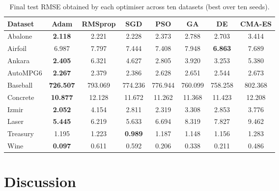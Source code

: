 \documentclass[a4paper,12pt,oneside]{article}
\begin{document}
\begin{table}[t]
\centering
\caption{Final test RMSE obtained by each optimiser across ten datasets
(best over ten seeds).}
\label{tab:stage3_results}
\begin{adjustbox}{max width=\textwidth}
\begin{tabular}{lccccccc}
\toprule
Dataset & Adam & RMSprop & SGD & PSO & GA & DE & CMA-ES \\
\midrule
Abalone   
& \textbf{2.118} & 2.221 & 2.228 & 2.373 & 2.788 & 2.703 & 3.414 \\

Airfoil  
& 6.987 & 7.797 & 7.444 & 7.408 & 7.948 & \textbf{6.863} & 7.689 \\

Ankara   
& \textbf{2.405} & 6.321 & 4.627 & 2.805 & 3.920 & 3.253 & 5.380 \\

AutoMPG6 
& \textbf{2.267} & 2.379 & 2.386 & 2.628 & 2.651 & 2.544 & 2.673 \\

Baseball 
& \textbf{726.507} & 793.069 & 774.236 & 776.944 & 760.099 & 758.258 & 802.368 \\

Concrete 
& \textbf{10.877} & 12.128 & 11.672 & 11.262 & 11.368 & 11.423 & 12.208 \\

Izmir    
& \textbf{2.052} & 4.154 & 2.811 & 2.319 & 3.308 & 2.853 & 3.776 \\

Laser    
& \textbf{5.445} & 6.219 & 5.633 & 6.694 & 8.319 & 7.827 & 9.462 \\

Treasury 
& 1.195 & 1.223 & \textbf{0.989} & 1.187 & 1.148 & 1.156 & 1.283 \\

Wine     
& \textbf{0.097} & 0.611 & 0.592 & 0.206 & 0.338 & 0.211 & 0.486 \\
\bottomrule
\end{tabular}
\end{adjustbox}
\end{table}




\section{Discussion}
\end{document}
